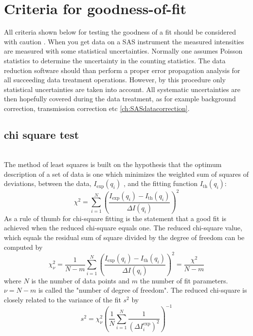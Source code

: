 
\clearpage
\section{Criteria for goodness-of-fit}
All criteria shown below for testing the goodness of a fit should be
considered with caution \cite{Bevington2003,Press2007}.
When you get data on a SAS instrument
the measured intensities are measured with some statistical uncertainties.
Normally one assumes Poisson statistics to determine the uncertainty
in the counting statistics. The data reduction software should than perform a
proper error propagation analysis for all succeeding data treatment operations.
However, by this procedure only statistical uncertainties are taken into account.
All systematic uncertainties are then hopefully covered during the data treatment,
as for example background correction, transmission correction etc \ref{ch:SASdatacorrection}.
~\\
\subsection{chi square test}
~\\
The method of least squares is built on the hypothesis that the
optimum description of a set of data is one which minimizes the
weighted sum of squares of deviations, between the data,
$I_\text{exp}(q_i)$ , and the fitting function $I_\text{th}(q_i)$:
\begin{equation}
\chi^2 = \displaystyle\sum_{i=1}^N
\left(\frac{I_\text{exp}(q_i)-I_\text{th}(q_i)}{\Delta
I(q_i)}\right)^2
\label{eq:chi2}
\end{equation}
As a rule of thumb for chi-square fitting is the statement that a
good fit is achieved when the reduced chi-square equals one. The
reduced chi-square value, which equals the residual sum of square
divided by the degree of freedom can be computed by
\begin{equation}
\chi^2_\nu = \displaystyle \frac{1}{N-m} \sum_{i=1}^N
\left(\frac{I_\text{exp}(q_i)-I_\text{th}(q_i)}{\Delta
I(q_i)}\right)^2 = \frac{\chi^2}{N-m}
\end{equation}
where $N$ is the number of data points and $m$ the number of fit parameters.
$\nu=N-m$ is called the "number of degree of freedom". The reduced chi-square
is closely related to the variance of the fit $s^2$ by
\begin{equation}
s^2=\chi_\nu^2 \left( \frac{1}{N}\sum_{i=1}^N \frac{1}{\left(\Delta I_i^\text{exp}\right)^2}\right)^{-1}
\end{equation}


